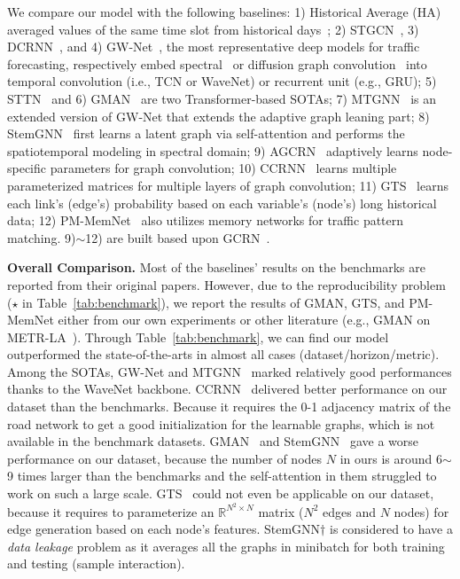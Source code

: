 \documentclass[letterpaper]{article} \usepackage{aaai23}  \usepackage{times}  \usepackage{helvet}  \usepackage{courier}  \usepackage[hyphens]{url}  \usepackage{graphicx} \urlstyle{rm} \def\UrlFont{\rm}  \usepackage{natbib}  \usepackage{caption} \usepackage{multirow}
\begin{document}
We compare our model with the following baselines: 1) Historical Average (HA) averaged values of the same time slot from historical days~\cite{li2018diffusion}; 2) STGCN~\cite{yu2018spatio}, 3) DCRNN~\cite{li2018diffusion}, and 4) GW-Net~\cite{wu2019graph}, the most representative deep models for traffic forecasting, respectively embed spectral~\cite{yu2018spatio} or diffusion graph convolution~\cite{li2018diffusion,wu2019graph} into temporal convolution (i.e., TCN or WaveNet)\cite{yu2018spatio,wu2019graph} or recurrent unit (e.g., GRU)\cite{li2018diffusion}; 5) STTN~\cite{xu2020spatial} and 6) GMAN~\cite{zheng2020gman} are two Transformer-based SOTAs; 7) MTGNN~\cite{wu2020connecting} is an extended version of GW-Net that extends the adaptive graph leaning part;
8) StemGNN~\cite{cao2020spectral} first learns a latent graph via self-attention and performs the spatiotemporal modeling in spectral domain; 9) AGCRN~\cite{bai2020adaptive} adaptively learns node-specific parameters for graph convolution; 10) CCRNN~\cite{ye2021coupled} learns multiple parameterized matrices for multiple layers of graph convolution; 11) GTS~\cite{shang2021discrete} learns each link's (edge's) probability based on each variable's (node's) long historical data; 12) PM-MemNet~\cite{lee2021learning} also utilizes memory networks for traffic pattern matching. 9)$\sim$12) are built based upon GCRN~\cite{seo2018structured,li2018diffusion}. 



\noindent\textbf{Overall Comparison.} Most of the baselines' results on the benchmarks are reported from their original papers. However, due to the reproducibility problem ($\star$ in Table~\ref{tab:benchmark}), we report the results of GMAN, GTS, and PM-MemNet either from our own experiments or other literature (e.g., GMAN on METR-LA~\cite{shao2022pre}). Through Table~\ref{tab:benchmark}, we can find our model outperformed the state-of-the-arts in almost all cases (dataset/horizon/metric). Among the SOTAs, GW-Net\cite{wu2019graph} and MTGNN~\cite{wu2020connecting} marked relatively good performances thanks to the WaveNet backbone. CCRNN~\cite{ye2021coupled} delivered better performance on our dataset than the benchmarks. Because it requires the 0-1 adjacency matrix of the road network to get a good initialization for the learnable graphs, which is not available in the benchmark datasets. GMAN~\cite{zheng2020gman} and StemGNN~\cite{cao2020spectral} gave a worse performance on our dataset, because the number of nodes $N$ in ours is around 6$\sim$9 times larger than the benchmarks and the self-attention in them struggled to work on such a large scale. GTS~\cite{shang2021discrete} could not even be applicable on our dataset, because it requires to parameterize an $\mathbb{R}^{N^2\times N}$ matrix ($N^2$ edges and $N$ nodes) for edge generation based on each node's features. StemGNN$\dagger$ is considered to have a \textit{data leakage} problem as it averages all the graphs in minibatch for both training and testing (sample interaction). 
\end{document}
